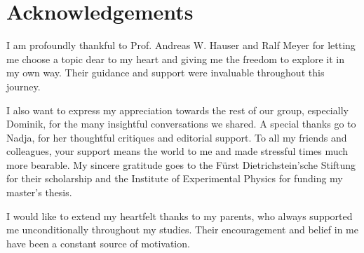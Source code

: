 \chapter*{Acknowledgements}
\label{chap:acknowledgements}

I am profoundly thankful to Prof. Andreas W. Hauser and Ralf Meyer for letting me choose a topic dear to my heart and giving me the freedom to explore it in my own way. Their guidance and support were invaluable throughout this journey.

I also want to express my appreciation towards the rest of our group, especially Dominik, for the many insightful conversations we shared. A special thanks go to Nadja, for her thoughtful critiques and editorial support. To all my friends and colleagues, your support means the world to me and made stressful times much more bearable. My sincere gratitude goes to the Fürst Dietrichstein'sche Stiftung for their scholarship and the Institute of Experimental Physics for funding my master's thesis.

I would like to extend my heartfelt thanks to my parents, who always supported me unconditionally throughout my studies. Their encouragement and belief in me have been a constant source of motivation. 